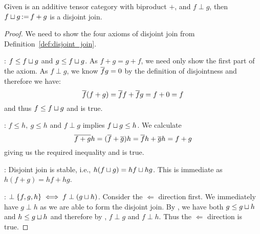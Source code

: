 \begin{proposition}\label{prop:biproduct_is_the_disjoint_join_in_cfrobx}
  Given \X is an  additive tensor category with biproduct $+$, and $f\perp g$, then $f\sqcup g
  \operatorname*{:\!=} f+g$ is a disjoint join.
\end{proposition}
\begin{proof}
  We need to show the four axioms of disjoint join from Definition~\ref{def:disjoint_join}.

   : $f \le f \sqcup g$ and $g \le f \sqcup g$.
  As $f+g = g+f$, we need only show the first part of the axiom. As $f\perp g$, we know $\overline{f}g=0$
  by the definition of disjointness and therefore we have:
  \[
    \overline{f}(f+g) = \overline{f}f + \overline{f} g = f + 0 = f
  \]
  and thus $f \le f \sqcup g$ and  is true.

  : $f \le h,\ g \le h$ and $f\perp g$ implies $f \sqcup g \le h$.  We calculate
  \[
    \overline{f+g}h = (\overline{f}+\overline{g}) h = \overline{f}h + \overline{g} h = f + g
  \]
  giving us the required inequality and  is true.

  : Disjoint join is stable, i.e., $h(f \sqcup g) = h f \sqcup h g$. This is immediate
  as $h(f+g) = hf + h g$.

  : $\perp \{f, g, h\} \iff f \perp (g\sqcup h)$. Consider the $\Longleftarrow$
  direction first. We immediately have $g\perp h$ as we are able to form the disjoint join. By
  , we have both $g \le g \sqcup h$ and $h \le g\sqcup h$ and therefore by
  , $f \perp g$ and $f\perp h$. Thus the $\Longleftarrow$ direction is true.


\end{proof}
